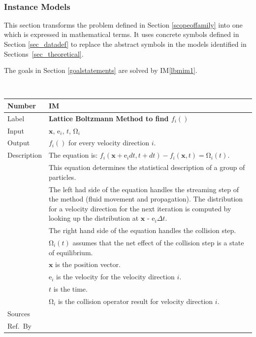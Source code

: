 \documentclass[12pt]{article}
\newcommand{\colAwidth}{0.13\textwidth}
\newcommand{\colBwidth}{0.82\textwidth}
\newcounter{instnum} %
\begin{document}
~\newpage

\subsubsection{Instance Models} \label{sec_instance}    

This section transforms the problem defined in Section \ref{scopeoffamily} into 
one which is expressed in mathematical terms. It uses concrete symbols defined 
in Section \ref{sec_datadef} to replace the abstract symbols in the models 
identified in Sections~\ref{sec_theoretical}.

The goals in Section \ref{goalstatements} are solved by IM\ref{lbmim1}.

~\newline


\noindent
\begin{minipage}{\textwidth}
	\renewcommand*{\arraystretch}{1.5}
	\begin{tabular}{| p{\colAwidth} | p{\colBwidth}|}
		\hline
		\rowcolor[gray]{0.9}
		Number& IM{instnum}\theinstnum \label{lbmim1}\\
		\hline
		Label& \bf Lattice Boltzmann Method to find $f_i()$\\
		\hline		
		Input&$\mathrm{\textbf{x}}$, $\mathrm{e}_i$, $t$, $\mathrm{\Omega}_i$\\
		\hline
		Output& $f_i()$ for every velocity direction $i$.\\
		\hline
		Description&
		The equation is: $f_i(\mathrm{\textbf{x}} +\mathrm{e}_i dt, t + dt) - f_i(\mathrm{\textbf{x}},t) = \mathrm{\Omega}_i (t)$.\\
		&This equation determines the statistical description of a group of particles.\\
		&The left had side of the equation handles the streaming step of the method (fluid movement and propagation). The distribution for a velocity direction for the next iteration is computed by looking up the distribution at $\mathrm{\textbf{x}}$ - $\mathrm{e}_i \Delta t$.\\
		&The right hand side of the equation handles the collision step.\\ &$\mathrm{\Omega}_i (t)$ assumes that the net effect of the collision step is a state of equilibrium.\\
		&$\mathrm{\textbf{x}}$ is the position vector.\\ 
		&$\mathrm{e}_i$ is the velocity for the velocity direction $i$.\\ 
		&$t$ is the time.\\ 
		&$\mathrm{\Omega}_i$ is the collision operator result for velocity direction $i$.\\
		\hline
		Sources& \citet{gibiansky} \\
		\hline
		Ref.\ By & \\
		\hline
	\end{tabular}
\end{minipage}\\
\end{document}
